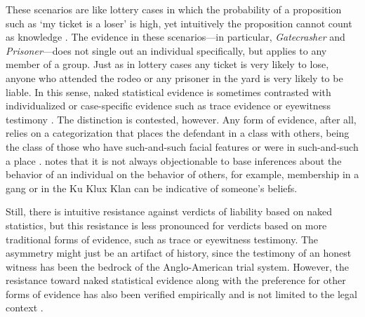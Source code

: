 \documentclass{article}
\begin{document}
These scenarios are like lottery cases in which the probability of a proposition such as `my ticket is a loser' is high,  yet intuitively the proposition cannot count as knowledge \citep[see e.g.][]{Harman1968, Nelkin2000The-Lottery-Par, hawthorne2004knowledge, Lawlor2013Assurance,  ebert2018}. 
%
The  evidence in these scenarios---in particular, \textit{Gatecrasher} and \textit{Prisoner}---does not single out an individual specifically, but applies to any member of a group.  
Just as in lottery cases any ticket is very likely to lose,
 anyone who attended the rodeo or any prisoner in the yard is very likely to be liable.  
 In this sense, naked statistical evidence is sometimes contrasted with individualized or case-specific evidence such as trace evidence or eyewitness testimony \citep{williams1979, Thomson86, colyvan2001crime}.
 The distinction is contested, however. Any form of evidence, after all, relies on a categorization that places the defendant in a class with others, being the class of those  who have such-and-such facial features or were in such-and-such a place \citep{saks80,schoeman87,wright1987causation,Shauer2003Profiles-Probab, harcourt2006}.
  \cite{tillers97, tillers2005if} notes that it is not always objectionable to base inferences about the behavior of an individual on the behavior of others, for example,  membership in a gang or in the Ku Klux Klan can be indicative of someone's beliefs.
  
  
Still, there is intuitive resistance against verdicts of liability based on naked statistics, but this resistance is less pronounced for verdicts based on more traditional forms of evidence, such as trace or eyewitness testimony. %
The asymmetry might just be an artifact of history, since the testimony of an honest witness has been the bedrock of the Anglo-American trial system. 
However, the resistance toward naked statistical evidence along with the preference for other forms of evidence has also been verified empirically  \citep{wells1992naked, niedermeierEtAl1999, arkesEtAl2012} and is not limited to the legal context \citep{sykes1999, friedman2015, ebert2018}. 
\end{document}
